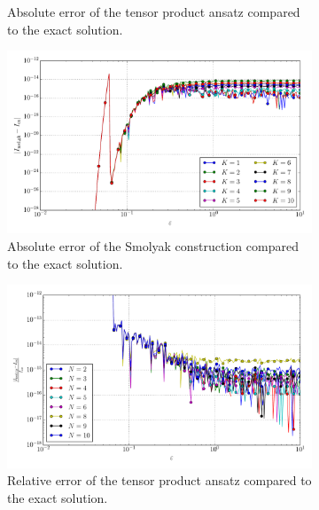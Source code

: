 \documentclass[a4paper,10pt]{article}
\begin{document}
\begin{figure}[ht!]
\begin{subfigure}[t]{0.5\linewidth}
    \caption{Absolute error of the tensor product ansatz compared to the exact solution.}
    \label{fig:tp_sg_3d_conv_eps_000_000_err_nsd_tp}
  \end{subfigure}
  \begin{subfigure}[t]{0.5\linewidth}
    \includegraphics[width=\linewidth]{./plots/tp_sg_3d_conv_eps_(0,0,0)_(0,0,0)_err_nsd_gk.pdf}
    \caption{Absolute error of the Smolyak construction compared to the exact solution.}
    \label{fig:tp_sg_3d_conv_eps_000_000_err_nsd_gk}
  \end{subfigure}
  \begin{subfigure}[t]{0.5\linewidth}
    \includegraphics[width=\linewidth]{./plots/tp_sg_3d_conv_eps_(0,0,0)_(0,0,0)_err_rel_nsd_tp.pdf}
    \caption{Relative error of the tensor product ansatz compared to the exact solution.}
    \label{fig:tp_sg_3d_conv_eps_000_000_err_rel_nsd_tp}
  \end{subfigure}
  \begin{subfigure}[t]{0.5\linewidth}

\end{subfigure}
\end{figure}
\end{document}
